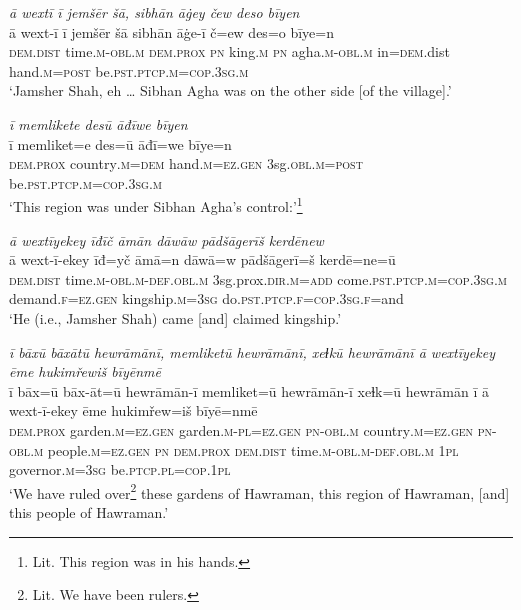 \ea \label{DP.12}
\textit{ā wextī ī jemšēr šā, sibhān āġey čew deso bīyen} \\ 
\gll ā wext-ī ī jemšēr šā sibhān āġe-ī č=ew des=o bīye=n \\ 
 \textsc{dem.dist} time\textsc{.m}\textsc{-obl}\textsc{.m} \textsc{dem.prox} \textsc{pn} king\textsc{.m} \textsc{pn} agha\textsc{.m}\textsc{-obl}\textsc{.m} in\textsc{=dem}.dist hand\textsc{.m}\textsc{=\textsc{post}} be\textsc{.pst}\textsc{.ptcp}\textsc{.m}\textsc{=cop}\textsc{.3sg}\textsc{.m} \\ 
\glt `Jamsher Shah, eh … Sibhan Agha was on the other side [of the village].'
\z 
 
\ea \label{DP.14}
\textit{ī memlikete desū āđīwe bīyen} \\ 
\gll ī memliket=e des=ū āđī=we bīye=n \\ 
 \textsc{dem.prox} country\textsc{.m}\textsc{=dem} hand\textsc{.m}\textsc{=ez}\textsc{.gen} 3sg\textsc{.obl}\textsc{.m}\textsc{=\textsc{post}} be\textsc{.pst}\textsc{.ptcp}\textsc{.m}\textsc{=cop}\textsc{.3sg}\textsc{.m} \\ 
\glt `This region was under Sibhan Agha’s control:'\footnote{Lit. This region was in his hands.}
\z 
 
\ea \label{DP.17}
\textit{ā wextīyekey īđīč āmān dāwāw pādšāgerīš kerdēnew} \\ 
\gll ā wext-ī-ekey īđ=yč āmā=n dāwā=w pādšāgerī=š kerdē=ne=ū \\ 
 \textsc{dem.dist} time\textsc{.m}\textsc{-obl}\textsc{.m}\textsc{-def}\textsc{.obl}\textsc{.m} 3sg.prox\textsc{.dir}\textsc{.m}\textsc{=add} come\textsc{.pst}\textsc{.ptcp}\textsc{.m}\textsc{=cop}\textsc{.3sg}\textsc{.m} demand\textsc{\textsc{.f}}\textsc{=ez}\textsc{.gen} kingship\textsc{.m}\textsc{=3sg} do\textsc{.pst}\textsc{.ptcp}\textsc{\textsc{.f}}\textsc{=cop}\textsc{.3sg}\textsc{\textsc{.f}}=and \\ 
\glt `He (i.e., Jamsher Shah) came [and] claimed kingship.'
\z 
 
\ea \label{DP.21}
\textit{ī bāxū bāxātū hewrāmānī, memliketū hewrāmānī, xeɫkū hewrāmānī ā wextīyekey ēme hukimřewiš bīyēnmē} \\ 
\gll ī bāx=ū bāx-āt=ū hewrāmān-ī memliket=ū hewrāmān-ī xeɫk=ū hewrāmān ī ā wext-ī-ekey ēme hukimřew=iš bīyē=nmē \\ 
 \textsc{dem.prox} garden\textsc{.m}\textsc{=ez}\textsc{.gen} garden\textsc{.m}\textsc{-pl}\textsc{=ez}\textsc{.gen} \textsc{pn}\textsc{-obl}\textsc{.m} country\textsc{.m}\textsc{=ez}\textsc{.gen} \textsc{pn}\textsc{-obl}\textsc{.m} people\textsc{.m}\textsc{=ez}\textsc{.gen} \textsc{pn} \textsc{dem.prox} \textsc{dem.dist} time\textsc{.m}\textsc{-obl}\textsc{.m}\textsc{-def}\textsc{.obl}\textsc{.m} \textsc{1pl} governor\textsc{.m}\textsc{=3sg} be\textsc{.ptcp}\textsc{.pl}\textsc{=cop}\textsc{.1pl} \\ 
\glt `We have ruled over\footnote{Lit. We have been rulers.} these gardens of Hawraman, this region of Hawraman, [and] this people of Hawraman.'
\z 
 
